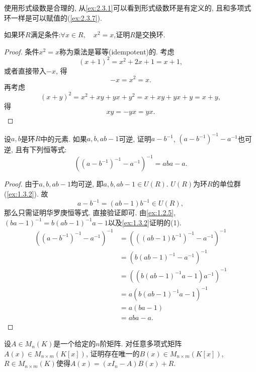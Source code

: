 \begin{remark}
    使用形式级数是合理的, 从\ref{ex:2.3.1}可以看到形式级数环是有定义的, 且和多项式环一样是可以赋值的(\ref{ex:2.3.7}).
\end{remark}

\begin{problem}\label{ex:1.2.6}
    如果环$R$满足条件:$\forall x \in R,\quad x^2 = x$,证明$R$是交换环.
\end{problem}

\begin{proof}
    条件$x^2 = x$称为乘法是幂等(idempotent)的. 考虑
    \[
        (x + 1)^2 = x^2 + 2x + 1 = x + 1,
    \]
    或者直接带入$-x$, 得
    \[
        -x = x^2 = x.
    \]
    再考虑
    \[
        (x + y)^2 = x^2 + xy + yx + y^2 = x + xy + yx + y = x + y,
    \]
    得
    \[
        xy = -yx = yx.
    \]
\end{proof}

\begin{problem}[华罗庚恒等式]
    设$a, b$是环$R$中的元素. 如果$a, b, ab - 1$可逆, 证明$a - b^{-1}$, $(a - b^{-1})^{-1} - a^{-1}$也可逆, 且有下列恒等式:
    \[
        \left((a - b^{-1})^{-1} - a^{-1}\right)^{-1} = aba - a.
    \]
\end{problem}

\begin{proof}
    由于$a, b, ab - 1$均可逆, 即$a, b, ab - 1 \in U(R)$. $U(R)$为环$R$的单位群(\ref{ex:1.3.2}). 故
    \[
        a - b^{-1} = (ab - 1)b^{-1} \in U(R),
    \]
    那么只需证明华罗庚恒等式. 直接验证即可. 由\ref{ex:1.2.5}, $(ba - 1)^{-1} = b(ab - 1)^{-1}a - 1$以及\ref{ex:1.3.2}证明的(1).
    \[
    \begin{aligned}
        \left((a - b^{-1})^{-1} - a^{-1}\right)^{-1} &= \left(((ab - 1)b^{-1})^{-1} - a^{-1}\right)^{-1}\\
        &= (b(ab - 1)^{-1} - a^{-1})^{-1}\\
        &= \left((b(ab - 1)^{-1}a - 1)a^{-1}\right)^{-1}\\
        &= a(b(ab - 1)^{-1}a - 1)^{-1}\\
        &= a(ba - 1)\\
        &= aba - a.
    \end{aligned}
    \]
\end{proof}

\begin{problem}[多项式矩阵的带余除法]\label{ex:1.2.8}
    设$A \in M_n(K)$是一个给定的$n$阶矩阵. 对任意多项式矩阵$A(x) \in M_{n \times m}(K[x])$, 证明存在唯一的$B(x) \in M_{n \times m}(K[x])$, $R \in M_{n \times m}(K)$使得$A(x) = (xI_n - A)B(x) + R$.
\end{problem}

